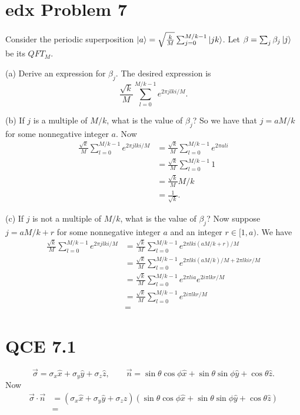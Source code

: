 \documentclass[10pt]{article}
\begin{document}
\section*{edx Problem 7}
Consider the periodic superposition $\ket{a} = \sqrt{\frac{k}{M}} \sum_{j = 0}^{M/k - 1} \ket{jk}$. Let $\beta = \sum_j \beta_j \ket{j}$ be its $QFT_M$.

(a) Derive an expression for $\beta_j$. The desired expression is
\[
\frac{\sqrt{k}}{M} \sum_{l = 0}^{M/k - 1} e^{2\pi j l k i/M}.
\] 

(b) If $j$ is a multiple of $M/k$, what is the value of $\beta_j$? So we have that $j = aM / k$ for some nonnegative integer $a$. Now
\begin{align*}
\frac{\sqrt{k}}{M} \sum_{l = 0}^{M/k - 1} e^{2\pi j l k i/M} &= \frac{\sqrt{k}}{M} \sum_{l = 0}^{M/k - 1} e^{2\pi a l  i} \\
&= \frac{\sqrt{k}}{M} \sum_{l = 0}^{M/k - 1} 1 \\
&= \frac{\sqrt{k}}{M} M/k \\
&= \frac{1}{\sqrt{k}}.
\end{align*}

(c) If $j$ is not a multiple of $M/k$, what is the value of $\beta_j$? Now suppose $j = aM/k + r$ for some nonnegative integer $a$ and an integer $r \in [1, a)$. We have
\begin{align*}
\frac{\sqrt{k}}{M} \sum_{l = 0}^{M/k - 1} e^{2\pi j l k i/M} &= \frac{\sqrt{k}}{M} \sum_{l = 0}^{M/k - 1} e^{2\pi l k i ( aM / k + r ) / M} \\
&= \frac{\sqrt{k}}{M} \sum_{l = 0}^{M/k - 1} e^{2\pi l k i ( aM / k ) / M + 2\pi l k i r / M }  \\
&= \frac{\sqrt{k}}{M} \sum_{l = 0}^{M/k - 1} e^{2 \pi l i a} e^{2 i \pi l k r / M} \\
&= \frac{\sqrt{k}}{M} \sum_{l = 0}^{M/k - 1} e^{2 i \pi l k r / M} \\
&= 
\end{align*}

\section*{QCE 7.1}
\[
\vec{\sigma} = \sigma_x \hat{x} + \sigma_y \hat{y} + \sigma_z \hat{z}, \qquad
\vec{n} = \sin \theta \cos \phi \hat{x} + \sin \theta \sin \phi \hat{y} + \cos \theta \hat{z}.
\]
Now
\begin{align*}
\vec{\sigma} \cdot \vec{n} &= (\sigma_x \hat{x} + \sigma_y \hat{y} + \sigma_z \hat{z})(\sin \theta \cos \phi \hat{x} + \sin \theta \sin \phi \hat{y} + \cos \theta \hat{z}) \\
            							   &= 
\end{align*}
\end{document}
